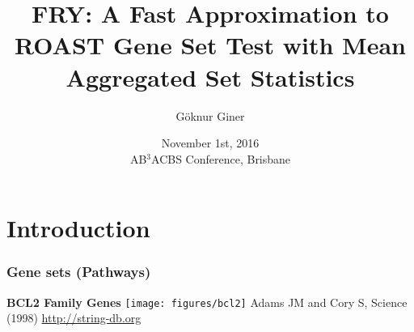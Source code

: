 \documentclass[9pt,t]{beamer}
\title{{\ttfamily FRY}: A Fast Approximation to {\ttfamily ROAST} Gene Set Test with Mean Aggregated Set Statistics}
\author[G\"{o}knur Giner]{G\"{o}knur Giner}
\date[November 1st, 2016]{November 1st, 2016\\
AB$^3$ACBS Conference, Brisbane}
\begin{document}
\begin{frame}[plain,t]
	\titlepage
\end{frame}

\section{Introduction}
\begin{frame}
	\frametitle{Gene sets \textbf{\color{oxygenrose} (Pathways)}}
	\vspace{0.1cm}
\begin{minipage}[t][0.9\textheight][b]{0.6\textwidth}
\flushleft
\textbf{\color{oxygenpurple} BCL2 Family Genes}
\vspace{0.05cm}
\vfill
  \texttt{[image: figures/bcl2]}
\vfill
\flushleft
\footnotesize{Adams JM and Cory S, Science (1998)} 
\flushleft
\footnotesize{\url{http://string-db.org}}
\end{minipage}
\hspace{0.4cm}
\end{frame}
\end{document}
